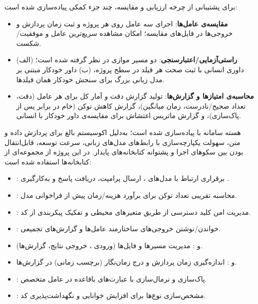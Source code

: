 
برای پشتیبانی از چرخه ارزیابی و مقایسه، چند جزء کمکی پیاده‌سازی شده است:
\begin{itemize}
\item \textbf{مقایسه‌ی عامل‌ها}: اجرای سه عامل روی هر پروژه و ثبت زمان پردازش و خروجی‌ها در فایل‌های مقایسه؛ امکان مشاهده سریع‌ترین عامل و موفقیت/شکست.
\item \textbf{راستی‌آزمایی/اعتبارسنجی}: دو مسیر موازی در نظر گرفته شده است؛ (الف) داوری انسانی با ثبت صحت هر فیلد در سطح پروژه، (ب) داور خودکار مبتنی بر مدل زبانی بزرگ برای سنجش خودکار همان فیلدها.
\item \textbf{محاسبه‌ی امتیازها و گزارش‌ها}: تولید گزارش دقت و آمار کل برای هر عامل (دقت، تعداد صحیح/نادرست، زمان میانگین)، گزارش کاهش توکن (خام در برابر پس از پاک‌سازی)، و گزارش ماتریس اغتشاش برای مقایسه‌ی داور خودکار با انسانی.
\end{itemize}



هسته سامانه با \textbf{} پیاده‌سازی شده است؛ به‌دلیل اکوسیستم بالغ برای پردازش داده و متن، سهولت یکپارچه‌سازی با رابط‌های مدل‌های زبانی، سرعت توسعه، قابل‌انتقال بودن بین سکوهای اجرا و پشتوانه کتابخانه‌های پایدار. در این پروژه از مجموعه‌ای از کتابخانه‌ها استفاده شده است:
\begin{itemize}
\item \textbf{}: برقراری ارتباط با مدل‌های \textit{}، ارسال پرامپت، دریافت پاسخ و به‌کارگیری .
\item \textbf{}: محاسبه تقریبی تعداد توکن برای برآورد هزینه/زمان پیش از فراخوانی مدل.
\item \textbf{}: مدیریت امن کلید دسترسی از طریق متغیرهای محیطی و تفکیک پیکربندی از کد.
\item \textbf{}: خواندن/نوشتن خروجی‌های ساختارمند عامل‌ها و گزارش‌های تجمیعی.
\item \textbf{} و \textbf{}: مدیریت مسیرها و فایل‌ها (ورودی ، خروجی نتایج، گزارش‌ها).
\item \textbf{} و \textbf{}: اندازه‌گیری زمان پردازش و درج زمان‌نگار (برچسب زمانی) در گزارش‌ها.
\item \textbf{}: پاک‌سازی و نرمال‌سازی  با عبارت‌های باقاعده در عامل متخصص.
\item \textbf{}: مشخص‌سازی نوع‌ها برای افزایش خوانایی و نگهداشت‌پذیری کد.
\end{itemize}


